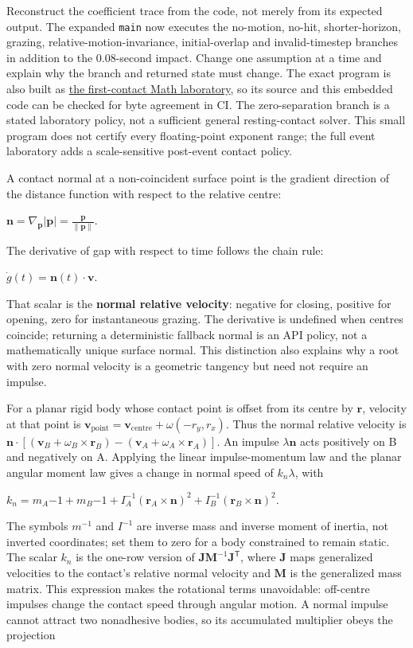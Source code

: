 Reconstruct the coefficient trace from the code, not merely from its expected output. The expanded \texttt{main} now executes the no-motion, no-hit, shorter-horizon, grazing, relative-motion-invariance, initial-overlap and invalid-timestep branches in addition to the 0.08-second impact. Change one assumption at a time and explain why the branch and returned state must change. The exact program is also built as \hyperref[source-file-c54e3c362767ccd1911378ae]{the first-contact Math laboratory}, so its source and this embedded code can be checked for byte agreement in CI. The zero-separation branch is a stated laboratory policy, not a sufficient general resting-contact solver. This small program does not certify every floating-point exponent range; the full event laboratory adds a scale-sensitive post-event contact policy.

A contact normal at a non-coincident surface point is the gradient direction of the distance function with respect to the relative centre:

\(\mathbf n=\nabla_{\mathbf p}|\mathbf p| =\frac{\mathbf p}{\|\mathbf p\|}.\)

The derivative of gap with respect to time follows the chain rule:

\(\dot g(t)=\mathbf n(t)\cdot\mathbf v.\)

That scalar is the \textbf{normal relative velocity}: negative for closing, positive for opening, zero for instantaneous grazing. The derivative is undefined when centres coincide; returning a deterministic fallback normal is an API policy, not a mathematically unique surface normal. This distinction also explains why a root with zero normal velocity is a geometric tangency but need not require an impulse.

For a planar rigid body whose contact point is offset from its centre by \(\mathbf r\), velocity at that point is \(\mathbf v_{\text{point}}=\mathbf v_{\text{centre}}+\omega(-r_y,r_x)\). Thus the normal relative velocity is \(\mathbf n\cdot[(\mathbf v_B+\omega_B\times\mathbf r_B)-(\mathbf v_A+\omega_A\times\mathbf r_A)]\). An impulse \(\lambda\mathbf n\) acts positively on B and negatively on A. Applying the linear impulse-momentum law and the planar angular moment law gives a change in normal speed of \(k_n\lambda\), with

\(k_n=m_A{-1}+m_B{-1} +I_A^{-1}(\mathbf r_A\times\mathbf n)^2 +I_B^{-1}(\mathbf r_B\times\mathbf n)^2.\)

The symbols \(m^{-1}\) and \(I^{-1}\) are inverse mass and inverse moment of inertia, not inverted coordinates; set them to zero for a body constrained to remain static. The scalar \(k_n\) is the one-row version of \(\mathbf J\mathbf M^{-1}\mathbf J^\mathsf T\), where \(\mathbf J\) maps generalized velocities to the contact's relative normal velocity and \(\mathbf M\) is the generalized mass matrix. This expression makes the rotational terms unavoidable: off-centre impulses change the contact speed through angular motion. A normal impulse cannot attract two nonadhesive bodies, so its accumulated multiplier obeys the projection

